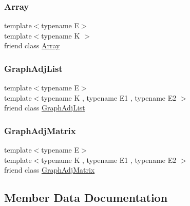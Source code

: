 \subsubsection{\texorpdfstring{Array}{Array}}
{\footnotesize\ttfamily template$<$typename E$>$ \\
template$<$typename K $>$ \\
friend class \mbox{\hyperlink{classbridges_1_1_array}{Array}}\hspace{0.3cm}{\ttfamily [friend]}}

\mbox{\label{classbridges_1_1_element_a65850138f0763fec43a76fb942f0eccc}} 
\subsubsection{\texorpdfstring{GraphAdjList}{GraphAdjList}}
{\footnotesize\ttfamily template$<$typename E$>$ \\
template$<$typename K , typename E1 , typename E2 $>$ \\
friend class \mbox{\hyperlink{classbridges_1_1_graph_adj_list}{Graph\+Adj\+List}}\hspace{0.3cm}{\ttfamily [friend]}}

\mbox{\label{classbridges_1_1_element_a1935808473b7eb8ff54149c5436c3ac9}} 
\subsubsection{\texorpdfstring{GraphAdjMatrix}{GraphAdjMatrix}}
{\footnotesize\ttfamily template$<$typename E$>$ \\
template$<$typename K , typename E1 , typename E2 $>$ \\
friend class \mbox{\hyperlink{classbridges_1_1_graph_adj_matrix}{Graph\+Adj\+Matrix}}\hspace{0.3cm}{\ttfamily [friend]}}



\subsection{Member Data Documentation}
\mbox{\label{classbridges_1_1_element_a6fb53728edc378f26238543b26238496}} 
